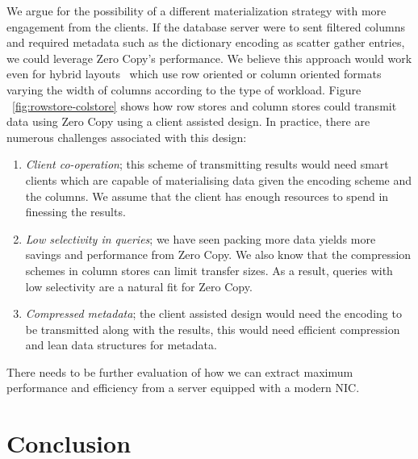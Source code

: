 We argue for the possibility of a different materialization strategy with more engagement from the 
clients. If the database server were to sent filtered columns and required metadata such as the 
dictionary encoding as scatter gather entries, we could leverage Zero Copy's performance. We believe 
this approach would work even for hybrid layouts~\cite{hyrise-hybridstores} which use row oriented or 
column oriented formats varying the width of columns according to the type of workload. Figure ~\ref{fig:rowstore-colstore}
shows how row stores and column stores could transmit data using Zero Copy using a client assisted design.
In practice, there are numerous challenges associated with this design:
\begin{enumerate}
\item {\em Client co-operation}; this scheme of transmitting results would need smart clients which are 
capable of materialising data given the encoding scheme and the columns. We assume that the client 
has enough resources to spend in finessing the results.
\item {\em Low selectivity in queries}; we have seen packing more data yields more savings and performance 
from Zero Copy. We also know that the compression schemes in column stores can limit transfer sizes. 
As a result, queries with low selectivity are a natural fit for Zero Copy.
\item {\em Compressed metadata}; the client assisted design would need the encoding to be transmitted
along with the results, this would need efficient compression and lean data structures for metadata.
\end{enumerate}
There needs to be further evaluation of how we can extract maximum performance and efficiency from 
a server equipped with a modern NIC.


\section{Conclusion}

